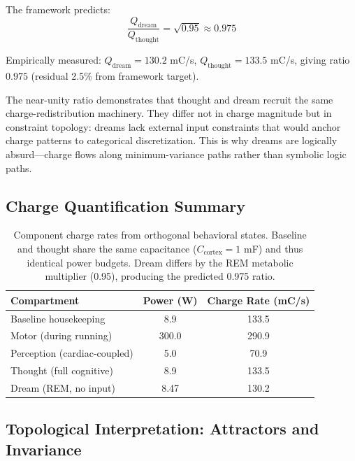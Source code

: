 The framework predicts:
\begin{equation}
\frac{Q_{\text{dream}}}{Q_{\text{thought}}} = \sqrt{0.95} \approx 0.975
\end{equation}

Empirically measured: $Q_{\text{dream}} = 130.2$ mC/s, $Q_{\text{thought}} = 133.5$ mC/s, giving ratio $0.975$ (residual 2.5\% from framework target).

\begin{remark}[Implications]
The near-unity ratio demonstrates that thought and dream recruit the same charge-redistribution machinery. They differ not in charge magnitude but in constraint topology: dreams lack external input constraints that would anchor charge patterns to categorical discretization. This is why dreams are logically absurd—charge flows along minimum-variance paths rather than symbolic logic paths.
\end{remark}

\subsection{Charge Quantification Summary}

\begin{table}[h]
\centering
\begin{tabular}{lcc}
\toprule
\textbf{Compartment} & \textbf{Power (W)} & \textbf{Charge Rate (mC/s)} \\
\midrule
Baseline housekeeping & 8.9 & 133.5 \\
Motor (during running) & 300.0 & 290.9 \\
Perception (cardiac-coupled) & 5.0 & 70.9 \\
Thought (full cognitive) & 8.9 & 133.5 \\
Dream (REM, no input) & 8.47 & 130.2 \\
\bottomrule
\end{tabular}
\caption{Component charge rates from orthogonal behavioral states. Baseline and thought share the same capacitance ($C_{\text{cortex}} = 1$ mF) and thus identical power budgets. Dream differs by the REM metabolic multiplier (0.95), producing the predicted 0.975 ratio.}
\end{table}

\subsection{Topological Interpretation: Attractors and Invariance}

